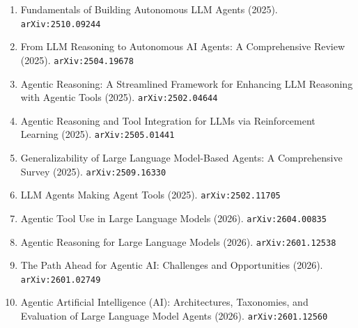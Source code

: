 \documentclass[11pt]{article}
\begin{document}
\begin{enumerate}
  \item Fundamentals of Building Autonomous LLM Agents (2025). \texttt{arXiv:2510.09244}
  \item From LLM Reasoning to Autonomous AI Agents: A Comprehensive Review (2025). \texttt{arXiv:2504.19678}
  \item Agentic Reasoning: A Streamlined Framework for Enhancing LLM Reasoning with Agentic Tools (2025). \texttt{arXiv:2502.04644}
  \item Agentic Reasoning and Tool Integration for LLMs via Reinforcement
  Learning (2025). \texttt{arXiv:2505.01441}
  \item Generalizability of Large Language Model-Based Agents: A Comprehensive Survey (2025). \texttt{arXiv:2509.16330}
  \item LLM Agents Making Agent Tools (2025). \texttt{arXiv:2502.11705}
  \item Agentic Tool Use in Large Language Models (2026). \texttt{arXiv:2604.00835}
  \item Agentic Reasoning for Large Language Models (2026). \texttt{arXiv:2601.12538}
  \item The Path Ahead for Agentic AI: Challenges and Opportunities (2026). \texttt{arXiv:2601.02749}
  \item Agentic Artificial Intelligence (AI): Architectures, Taxonomies, and Evaluation of Large Language Model Agents (2026). \texttt{arXiv:2601.12560}
\end{enumerate}
\end{document}

